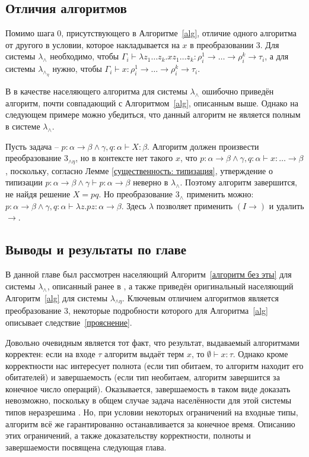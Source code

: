 \documentclass[../main.tex]{subfiles}
\begin{document}
\subsection{Отличия алгоритмов}

Помимо шага $0$, присутствующего в Алгоритме~\ref{alg}, отличие одного алгоритма от другого в условии, которое накладывается на $x$ в преобразовании $3$. Для системы $\lambda_\wedge$ необходимо, чтобы $\Gamma_i \vdash \lambda z_1 \dots z_k . x z_1 \dots z_k : \rho_i^1 \to \dots \to \rho_i^k \to \tau_i$, а для системы $\lambda_\wedge_\eta$ нужно, чтобы $\Gamma_i \vdash x : \rho_i^1 \to \dots \to \rho_i^k \to \tau_i$.

\emptyline

В \cite{kusmierek_2007} в качестве населяющего алгоритма для системы $\lambda_\wedge$ ошибочно приведён алгоритм, почти совпадающий с Алгоритмом~\ref{alg}, описанным выше. Однако на следующем примере можно убедиться, что данный алгоритм не является полным в системе $\lambda_\wedge$.

Пусть задача -- $p \colon \alpha \to \beta \wedge \gamma, q \colon \alpha \vdash X \colon \beta$. Алгоритм должен произвести преобразование $3_{\wedge \eta}$, но в контексте нет такого $x$, что $p \colon \alpha \to \beta \wedge \gamma, q \colon \alpha \vdash x \colon \dots \to \beta$, поскольку, согласно Лемме \ref{существенность: типизация}, утверждение о типизации $p \colon \alpha \to \beta \wedge \gamma \vdash p \colon \alpha \to \beta$ неверно в $\lambda_\wedge$. Поэтому алгоритм завершится, не найдя решение $X = pq$. 
Но преобразование $3_\wedge$ применить можно: $p \colon \alpha \to \beta \wedge \gamma, q \colon \alpha \vdash \lambda z . pz \colon \alpha \to \beta$. Здесь $\lambda$ позволяет применить $(I \to)$ и удалить $\to$.

\subsection{Выводы и результаты по главе}

В данной главе был рассмотрен населяющий Алгоритм~\ref{алгоритм без эты} для системы $\lambda_\wedge$, описанный ранее в \cite{kusmierek_2007}, а также приведён оригинальный населяющий Алгоритм~\ref{alg} для системы $\lambda_{\wedge \eta}$. Ключевым отличием алгоритмов является преобразование $3$, некоторые подробности которого для Алгоритма~\ref{alg} описывает следствие~\ref{прояснение}.

Довольно очевидным является тот факт, что результат, выдаваемый алгоритмами корректен: если на входе $\tau$ алгоритм выдаёт терм $x$, то $\emptyset \vdash x \colon \tau$. Однако кроме корректности нас интересует полнота (если тип обитаем, то алгоритм находит его обитателей) и завершаемость (если тип необитаем, алгоритм завершится за конечное число операций). Оказывается, завершаемость в таком виде доказать невозможно, поскольку в общем случае задача населённости для этой системы типов неразрешима \cite{urzyczyn_1999}. Но, при условии некоторых ограничений на входные типы, алгоритм всё же гарантированно останавливается за конечное время. Описанию этих ограничений, а также доказательству корректности, полноты и завершаемости посвящена следующая глава.
\end{document}
